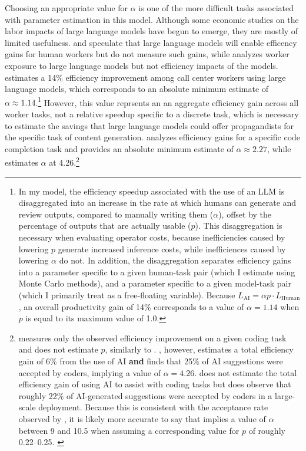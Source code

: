 \documentclass{article}
\begin{document}
Choosing an appropriate value for $\alpha$ is one of the more difficult tasks associated with parameter estimation in this model. Although some economic studies on the labor impacts of large language models have begun to emerge, \cite{brynjolfsson, codemodels, gptsasgpts, github, korinek, googleproductivity} they are mostly of limited usefulness. \cite{codemodels} and \cite{korinek} speculate that large language models will enable efficency gains for human workers but do not measure such gains, while \cite{gptsasgpts} analyzes worker exposure to large language models but not efficiency impacts of the models. \cite{brynjolfsson} estimates a 14\% efficiency improvement among call center workers using large language models, which corresponds to an absolute minimum estimate of $\alpha \approx 1.14$.\footnote{In my model, the efficiency speedup associated with the use of an LLM is disaggregated into an increase in the rate at which humans can generate and review outputs, compared to manually writing them ($\alpha$), offset by the percentage of outputs that are actually usable ($p$). This disaggregation is necessary when evaluating operator costs, because inefficiencies caused by lowering $p$ generate increased inference costs, while inefficiences caused by lowering $\alpha$ do not. In addition, the disaggregation separates efficiency gains into a parameter specific to a given human-task pair (which I estimate using Monte Carlo methods), and a parameter specific to a given model-task pair (which I primarily treat as a free-floating variable). Because $L_{\text{AI}} = \alpha p \cdot L_{\text{Human}}$, an overall productivity gain of 14\% corresponds to a value of $\alpha = 1.14$ when $p$ is equal to its maximum value of 1.0.} However, this value reprsents an an aggregate efficiency gain across all worker tasks, not a relative speedup specific to a discrete task, which is necessary to estimate the savings that large language models could offer propagandists for the specific task of content generation. \cite{github} analyzes efficiency gains for a specific code completion task and provides an absolute minimum estimate of $\alpha \approx 2.27$, while \cite{googleproductivity} estimates $\alpha$ at 4.26.\footnote{\cite{github} measures only the observed efficiency improvement on a given coding task and does not estimate $p$, similarly to \cite{brynjolfsson}. \cite{googleproductivity}, however, estimates a total efficiency gain of 6\% from the use of AI \textbf{and} finds that 25\% of AI suggestions were accepted by coders, implying a value of $\alpha = 4.26$. \cite{meta} does not estimate the total efficiency gain of using AI to assist with coding tasks but does observe that roughly 22\% of AI-generated suggestions were accepted by coders in a large-scale deployment. Because this is consistent with the acceptance rate observed by \cite{googleproductivity}, it is likely more accurate to say that \cite{github} implies a value of $\alpha$ between 9 and 10.5 when assuming a corresponding value for $p$ of roughly 0.22–0.25. \label{efficiency}}
\end{document}
